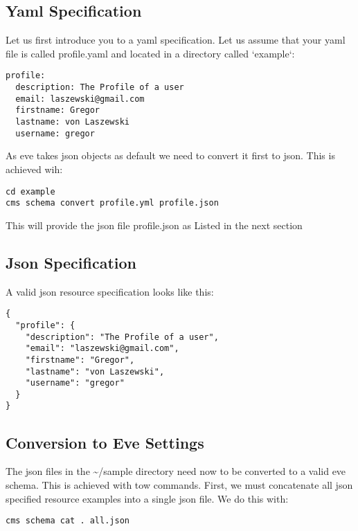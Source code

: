 \subsection{Yaml Specification}\label{yaml-specification}

Let us first introduce you to a yaml specification. Let us assume that
your yaml file is called profile.yaml and located in a directory called
`example`:

\begin{verbatim}
profile:
  description: The Profile of a user
  email: laszewski@gmail.com
  firstname: Gregor
  lastname: von Laszewski
  username: gregor
\end{verbatim}

As eve takes json objects as default we need to convert it first to
json. This is achieved wih:

\begin{verbatim}
cd example
cms schema convert profile.yml profile.json
\end{verbatim}

This will provide the json file profile.json as Listed in the next
section

\subsection{Json Specification}\label{json-specification}

A valid json resource specification looks like this:

\begin{verbatim}
{
  "profile": {
    "description": "The Profile of a user",
    "email": "laszewski@gmail.com",
    "firstname": "Gregor",
    "lastname": "von Laszewski",
    "username": "gregor"
  }
}
\end{verbatim}

\subsection{Conversion to Eve
Settings}\label{conversion-to-eve-settings}

The json files in the \textasciitilde{}/sample directory need now to be
converted to a valid eve schema. This is achieved with tow commands.
First, we must concatenate all json specified resource examples into a
single json file. We do this with:

\begin{verbatim}
cms schema cat . all.json
\end{verbatim}


